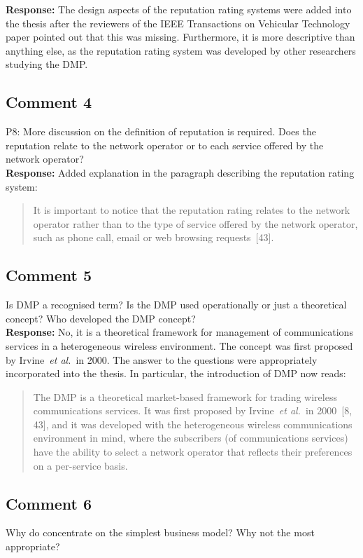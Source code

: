\documentclass[10pt,a4paper,notitlepage]{article}
\numberwithin{equation}{section}
\begin{document}
\textbf{Response:}
The design aspects of the reputation rating systems were added into the thesis after the reviewers of the IEEE Transactions on Vehicular Technology paper pointed out that this was missing. Furthermore, it is more descriptive than anything else, as the reputation rating system was developed by other researchers studying the DMP.

\subsection{Comment 4}
P8: More discussion on the definition of reputation is required. Does the reputation relate to the network operator or to each service offered by the network operator?\\[-2ex]

\textbf{Response:}
Added explanation in the paragraph describing the reputation rating system:
\begin{quote}
It is important to notice that the reputation rating relates to the network operator rather than to the type of service offered by the network operator, such as phone call, email or web browsing requests~[43].
\end{quote}

\subsection{Comment 5}
Is DMP a recognised term? Is the DMP used operationally or just a theoretical concept? Who developed the DMP concept?\\[-2ex]

\textbf{Response:}
No, it is a theoretical framework for management of communications services in a heterogeneous wireless environment. The concept was first proposed by Irvine~\emph{et al.}~in 2000. The answer to the questions were appropriately incorporated into the thesis. In particular, the introduction of DMP now reads:
\begin{quote}
The DMP is a theoretical market-based framework for trading wireless communications services. It was first proposed by Irvine~\emph{et al.}~in 2000~[8, 43], and it was developed with the heterogeneous wireless communications environment in mind, where the subscribers (of communications services) have the ability to select a network operator that reflects their preferences on a per-service basis.
\end{quote}

\subsection{Comment 6}
Why do concentrate on the simplest business model? Why not the most appropriate?\\[-2ex]
\end{document}
